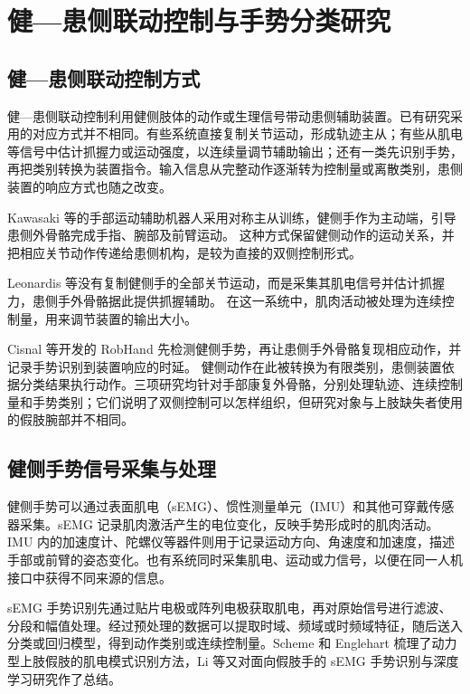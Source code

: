 \section{健—患侧联动控制与手势分类研究}

\subsection{健—患侧联动控制方式}

健—患侧联动控制利用健侧肢体的动作或生理信号带动患侧辅助装置。已有研究采用的对应方式并不相同。有些系统直接复制关节运动，形成轨迹主从；有些从肌电等信号中估计抓握力或运动强度，以连续量调节辅助输出；还有一类先识别手势，再把类别转换为装置指令。输入信息从完整动作逐渐转为控制量或离散类别，患侧装置的响应方式也随之改变。

Kawasaki 等的手部运动辅助机器人采用对称主从训练，健侧手作为主动端，引导患侧外骨骼完成手指、腕部及前臂运动。\cite{Kawasaki2014HandMotionAssist} 这种方式保留健侧动作的运动关系，并把相应关节动作传递给患侧机构，是较为直接的双侧控制形式。

Leonardis 等没有复制健侧手的全部关节运动，而是采集其肌电信号并估计抓握力，患侧手外骨骼据此提供抓握辅助。\cite{Leonardis2015BilateralExoskeleton} 在这一系统中，肌肉活动被处理为连续控制量，用来调节装置的输出大小。

Cisnal 等开发的 RobHand 先检测健侧手势，再让患侧手外骨骼复现相应动作，并记录手势识别到装置响应的时延。\cite{Cisnal2021RobHand} 健侧动作在此被转换为有限类别，患侧装置依据分类结果执行动作。三项研究均针对手部康复外骨骼，分别处理轨迹、连续控制量和手势类别；它们说明了双侧控制可以怎样组织，但研究对象与上肢缺失者使用的假肢腕部并不相同。

\subsection{健侧手势信号采集与处理}

健侧手势可以通过表面肌电（sEMG）、惯性测量单元（IMU）和其他可穿戴传感器采集。sEMG 记录肌肉激活产生的电位变化，反映手势形成时的肌肉活动。IMU 内的加速度计、陀螺仪等器件则用于记录运动方向、角速度和加速度，描述手部或前臂的姿态变化。也有系统同时采集肌电、运动或力信号，以便在同一人机接口中获得不同来源的信息\cite{Zhou2022HybridSensorsProsthesis}。

sEMG 手势识别先通过贴片电极或阵列电极获取肌电，再对原始信号进行滤波、分段和幅值处理。经过预处理的数据可以提取时域、频域或时频域特征，随后送入分类或回归模型，得到动作类别或连续控制量。Scheme 和 Englehart 梳理了动力型上肢假肢的肌电模式识别方法，Li 等又对面向假肢手的 sEMG 手势识别与深度学习研究作了总结\cite{Scheme2011EMGPatternRecognition,Li2021SEMGGestureReview}。

